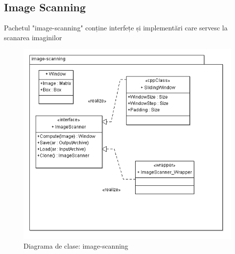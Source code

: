 \subsection{Image Scanning}
Pachetul "image-scanning" conține interfețe și implementări care servesc la scanarea imaginilor
\begin{figure}[H]
	\centering
		\includegraphics[width=1.00\textwidth]{uml/imagescanningClassDiagram.png}
	\caption{Diagrama de clase: image-scanning}
	\label{fig:imagescanningClassDiagram}
\end{figure}

\pagebreak
